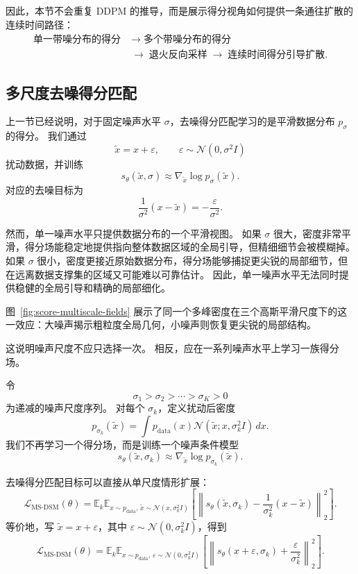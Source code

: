 因此，本节不会重复 DDPM 的推导，而是展示得分视角如何提供一条通往扩散的连续时间路径：
\[
\begin{aligned}
\text{单一带噪分布的得分}
&\;\longrightarrow\;
\text{多个带噪分布的得分}
\\
&\;\longrightarrow\;
\text{退火反向采样}
\;\longrightarrow\;
\text{连续时间得分引导扩散}.
\end{aligned}
\]

\subsection{多尺度去噪得分匹配}

上一节已经说明，对于固定噪声水平 $\sigma$，去噪得分匹配学习的是平滑数据分布 $p_\sigma$ 的得分。
我们通过
\[
\tilde{x}=x+\varepsilon,
\qquad
\varepsilon\sim\mathcal{N}(0,\sigma^2I)
\]
扰动数据，并训练
\[
s_\theta(\tilde{x},\sigma)
\approx
\nabla_{\tilde{x}}\log p_\sigma(\tilde{x}).
\]
对应的去噪目标为
\[
\frac{1}{\sigma^2}(x-\tilde{x})
=
-\frac{\varepsilon}{\sigma^2}.
\]

然而，单一噪声水平只提供数据分布的一个平滑视图。
如果 $\sigma$ 很大，密度非常平滑，得分场能稳定地提供指向整体数据区域的全局引导，但精细细节会被模糊掉。
如果 $\sigma$ 很小，密度更接近原始数据分布，得分场能够捕捉更尖锐的局部细节，但在远离数据支撑集的区域又可能难以可靠估计。
因此，单一噪声水平无法同时提供稳健的全局引导和精确的局部细化。

图~\ref{fig:score-multiscale-fields} 展示了同一个多峰密度在三个高斯平滑尺度下的这一效应：大噪声揭示粗粒度全局几何，小噪声则恢复更尖锐的局部结构。



这说明噪声尺度不应只选择一次。
相反，应在一系列噪声水平上学习一族得分场。

令
\[
\sigma_1>\sigma_2>\cdots>\sigma_K>0
\]
为递减的噪声尺度序列。
对每个 $\sigma_k$，定义扰动后密度
\[
p_{\sigma_k}(\tilde{x})
=
\int
p_{\text{data}}(x)
\mathcal{N}(\tilde{x};x,\sigma_k^2I)
\,dx.
\]
我们不再学习一个得分场，而是训练一个噪声条件模型
\[
s_\theta(\tilde{x},\sigma_k)
\approx
\nabla_{\tilde{x}}\log p_{\sigma_k}(\tilde{x}).
\]

去噪得分匹配目标可以直接从单尺度情形扩展：
\[
\boxed{
\mathcal{L}_{\text{MS-DSM}}(\theta)
=
\mathbb{E}_{k}
\mathbb{E}_{x\sim p_{\text{data}},\,
\tilde{x}\sim\mathcal{N}(x,\sigma_k^2I)}
\left[
\left\|
s_\theta(\tilde{x},\sigma_k)
-
\frac{1}{\sigma_k^2}(x-\tilde{x})
\right\|_2^2
\right].
}
\]
等价地，写 $\tilde{x}=x+\varepsilon$，其中
$\varepsilon\sim\mathcal{N}(0,\sigma_k^2I)$，得到
\[
\mathcal{L}_{\text{MS-DSM}}(\theta)
=
\mathbb{E}_{k}
\mathbb{E}_{x\sim p_{\text{data}},\,
\varepsilon\sim\mathcal{N}(0,\sigma_k^2I)}
\left[
\left\|
s_\theta(x+\varepsilon,\sigma_k)
+
\frac{\varepsilon}{\sigma_k^2}
\right\|_2^2
\right].
\]

